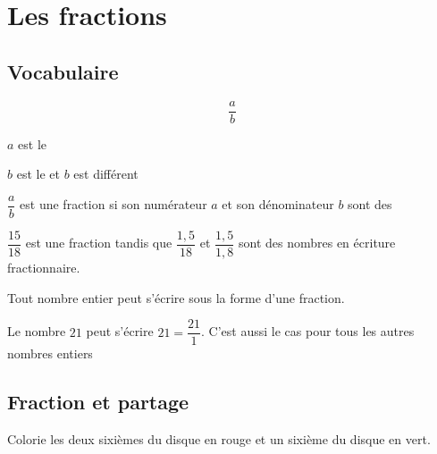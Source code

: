 \documentclass[a4paper,10pt]{report}
\begin{document}
\setcounter{chapter}{4}
\chapter{Les fractions}

\section{Vocabulaire}

\noindent \begin{minipage}{6cm}
\huge{$$\dfrac{a}{b}$$}
\end{minipage}
\begin{minipage}{10cm}
$a$ est le \dotfill \medskip

$b$ est le \dotfill et $b$ est différent \dotfill
\end{minipage}

\begin{defn}

$\dfrac{a}{b}$ est une fraction si son numérateur $a$ et son dénominateur $b$ sont des \dotfill
\end{defn}

\begin{ex}
$\dfrac{15}{18}$ est une fraction tandis que $\dfrac{1,5}{18}$ et $\dfrac{1,5}{1,8}$ sont des nombres en écriture fractionnaire.
\end{ex}

\begin{prop}
Tout nombre entier peut s'écrire sous la forme d'une fraction.
\end{prop}

\begin{ex}
Le nombre $21$ peut s'écrire $21=\dfrac{21}{1}$. C'est aussi le cas pour tous les autres nombres entiers
\end{ex}

\vspace{-3mm}
\section{Fraction et partage}

\begin{ex}
Colorie les deux sixièmes du disque en rouge et un sixième du disque en vert.

\vspace{-3cm}
\begin{flushright}
\end{flushright}
\end{ex}
\end{document}
